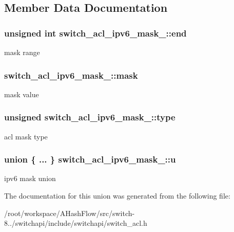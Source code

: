 \subsection{Member Data Documentation}
\hypertarget{unionswitch__acl__ipv6__mask___aca2c5fc2068fb9bdf27b61a95ef364c4}{
\subsubsection[{end}]{\setlength{\rightskip}{0pt plus 5cm}unsigned int switch\+\_\+acl\+\_\+ipv6\+\_\+mask\+\_\+\+::end}}\label{unionswitch__acl__ipv6__mask___aca2c5fc2068fb9bdf27b61a95ef364c4}
mask range \hypertarget{unionswitch__acl__ipv6__mask___ab9cd8578f5fc00ae613bf22aac8a37da}{
\subsubsection[{mask}]{ switch\+\_\+acl\+\_\+ipv6\+\_\+mask\+\_\+\+::mask}}\label{unionswitch__acl__ipv6__mask___ab9cd8578f5fc00ae613bf22aac8a37da}
mask value \hypertarget{unionswitch__acl__ipv6__mask___a28d3925d1cd16105103ec42b57c82eb0}{
\subsubsection[{type}]{\setlength{\rightskip}{0pt plus 5cm}unsigned switch\+\_\+acl\+\_\+ipv6\+\_\+mask\+\_\+\+::type}}\label{unionswitch__acl__ipv6__mask___a28d3925d1cd16105103ec42b57c82eb0}
acl mask type \hypertarget{unionswitch__acl__ipv6__mask___aa7cc95940e7fc130706f0a500b425e3f}{
\subsubsection[{u}]{\setlength{\rightskip}{0pt plus 5cm}union \{ ... \}   switch\+\_\+acl\+\_\+ipv6\+\_\+mask\+\_\+\+::u}}\label{unionswitch__acl__ipv6__mask___aa7cc95940e7fc130706f0a500b425e3f}
ipv6 mask union 

The documentation for this union was generated from the following file\+:\begin{DoxyCompactItemize}
\item 
/root/workspace/\+A\+Hash\+Flow/src/switch-\/8../switchapi/include/switchapi/switch\+\_\+acl.\+h\end{DoxyCompactItemize}
